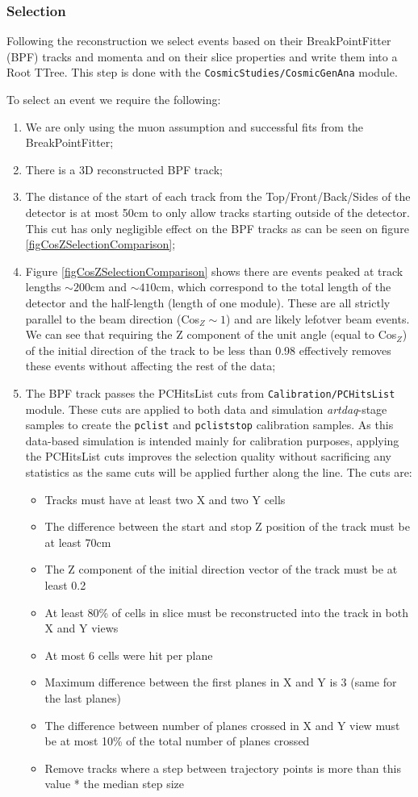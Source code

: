 \documentclass[12pt]{article}
\begin{document}
\subsubsection{Selection}
Following the reconstruction we select events based on their BreakPointFitter (BPF) tracks and momenta and on their slice properties and write them into a Root TTree. This step is done with the \texttt{CosmicStudies/CosmicGenAna} module. 

To select an event we require the following:
\begin{enumerate}
\item We are only using the muon assumption and successful fits from the BreakPointFitter;
\item There is a 3D reconstructed BPF track;
\item The distance of the start of each track from the Top/Front/Back/Sides of the detector is at most 50cm to only allow tracks starting outside of the detector. This cut has only negligible effect on the BPF tracks as can be seen on figure \ref{figCosZSelectionComparison};
\item Figure \ref{figCosZSelectionComparison} shows there are events peaked at track lengths $\sim 200$cm and $\sim 410$cm, which correspond to the total length of the detector and the half-length (length of one module). These are all strictly parallel to the beam direction (Cos$_Z\sim 1$) and are likely lefotver beam events. We can see that requiring the Z component of the unit angle (equal to Cos$_Z$) of the initial direction of the track to be less than 0.98 effectively removes these events without affecting the rest of the data;
\item The BPF track passes the PCHitsList cuts from \texttt{Calibration/PCHitsList} module. These cuts are applied to both data and simulation \textit{artdaq}-stage samples to create the \texttt{pclist} and \texttt{pcliststop} calibration samples. As this data-based simulation is intended mainly for calibration purposes, applying the PCHitsList cuts improves the selection quality without sacrificing any statistics as the same cuts will be applied further along the line. The cuts are:
\begin{itemize}
\item Tracks must have at least two X and two Y cells
\item The difference between the start and stop Z position of the track must be at least 70cm
\item The Z component of the initial direction vector of the track must be at least 0.2
\item At least 80\% of cells in slice must be reconstructed into the track in both X and Y views
\item At most 6 cells were hit per plane
\item Maximum difference between the first planes in X and Y is 3 (same for the last planes)
\item The difference between number of planes crossed in X and Y view must be at most 10\% of the total number of planes crossed
\item Remove tracks where a step between trajectory points is more than this value * the median step size
\end{itemize}


\end{enumerate}
\end{document}
